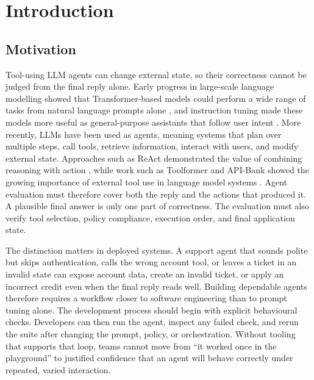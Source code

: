 
\chapter{Introduction}
\label{chap:introduction}

\section{Motivation}

Tool-using LLM agents can change external state, so their correctness cannot be judged from the final reply alone. Early progress in large-scale language modelling showed that Transformer-based models could perform a wide range of tasks from natural language prompts alone \citep{vaswani2017attention,brown2020language}, and instruction tuning made these models more useful as general-purpose assistants that follow user intent \citep{ouyang2022training}. More recently, LLMs have been used as agents, meaning systems that plan over multiple steps, call tools, retrieve information, interact with users, and modify external state. Approaches such as ReAct demonstrated the value of combining reasoning with action \citep{yao2023react}, while work such as Toolformer and API-Bank showed the growing importance of external tool use in language model systems \citep{schick2023toolformer,li2023apibank}. Agent evaluation must therefore cover both the reply and the actions that produced it. A plausible final answer is only one part of correctness. The evaluation must also verify tool selection, policy compliance, execution order, and final application state.

The distinction matters in deployed systems. A support agent that sounds polite but skips authentication, calls the wrong account tool, or leaves a ticket in an invalid state can expose account data, create an invalid ticket, or apply an incorrect credit even when the final reply reads well. Building dependable agents therefore requires a workflow closer to software engineering than to prompt tuning alone. The development process should begin with explicit behavioural checks. Developers can then run the agent, inspect any failed check, and rerun the suite after changing the prompt, policy, or orchestration. Without tooling that supports that loop, teams cannot move from ``it worked once in the playground'' to justified confidence that an agent will behave correctly under repeated, varied interaction.

